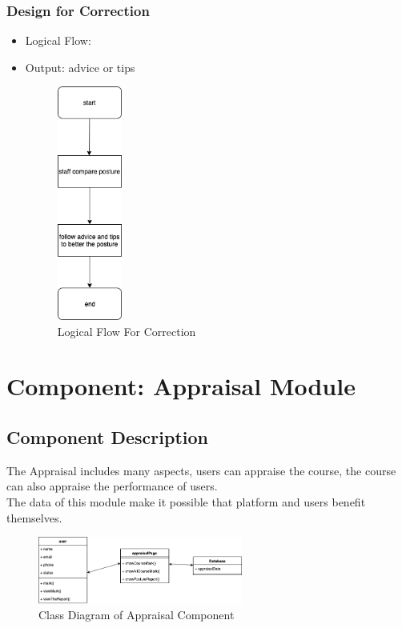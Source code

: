 \documentclass[16pt]{scrreprt}
\begin{document}
\subsubsection{Design for Correction}
\begin{itemize}
    \item Logical Flow:
    \item Output: advice or tips
    \begin{figure}[H]
        \centering
        \includegraphics[width=0.2\textwidth]{diagrams/flow-corrcetion.png}
        \caption{Logical Flow For Correction}
    \end{figure}
\end{itemize}

\section{Component: Appraisal Module}
\subsection{Component Description}
The Appraisal includes many aspects, users can appraise the course, the course can also appraise the performance of users.\\
The data of this module make it possible that platform and users benefit themselves.

\begin{figure}[H]
	\centering
	\includegraphics[width=0.6\textwidth]{diagrams/class-appraisal.png}
	\caption{Class Diagram of Appraisal Component}
\end{figure}
\end{document}

